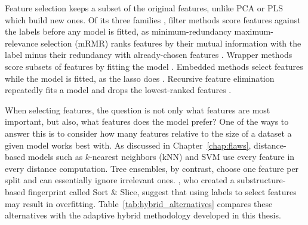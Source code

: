 Feature selection keeps a subset of the original features, unlike PCA or PLS which build new ones. Of its three families \citep{Guyon2003}, filter methods score features against the labels before any model is fitted, as minimum-redundancy maximum-relevance selection (mRMR) ranks features by their mutual information with the label minus their redundancy with already-chosen features \citep{Peng2005}. Wrapper methods score subsets of features by fitting the model \citep{Kohavi1997}. Embedded methods select features while the model is fitted, as the lasso does \citep{Tibshirani1996}. Recursive feature elimination repeatedly fits a model and drops the lowest-ranked features \citep{Guyon2002}.

When selecting features, the question is not only what features are most important, but also, what features does the model prefer? One of the ways to answer this is to consider how many features relative to the size of a dataset a given model works best with. As discussed in Chapter~\ref{chap:flaws}, distance-based models such as $k$-nearest neighbors (kNN) and SVM use every feature in every distance computation. Tree ensembles, by contrast, choose one feature per split and can essentially ignore irrelevant ones. \citet{sns}, who created a substructure-based fingerprint called Sort \& Slice, suggest that using labels to select features may result in overfitting. Table~\ref{tab:hybrid_alternatives} compares these alternatives with the adaptive hybrid methodology developed in this thesis. 

